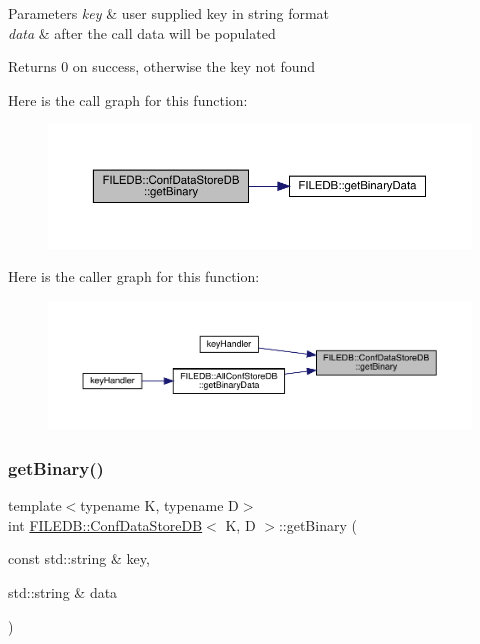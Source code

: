 \begin{DoxyParams}{Parameters}
{\em key} & user supplied key in string format \\
\hline
{\em data} & after the call data will be populated \\
\hline
\end{DoxyParams}
\begin{DoxyReturn}{Returns}
0 on success, otherwise the key not found 
\end{DoxyReturn}
Here is the call graph for this function\+:
\nopagebreak
\begin{figure}[H]
\begin{center}
\leavevmode
\includegraphics[width=350pt]{d8/d19/classFILEDB_1_1ConfDataStoreDB_a971e372585c497dad3b1bc589bc4dd15_cgraph}
\end{center}
\end{figure}
Here is the caller graph for this function\+:\nopagebreak
\begin{figure}[H]
\begin{center}
\leavevmode
\includegraphics[width=350pt]{d8/d19/classFILEDB_1_1ConfDataStoreDB_a971e372585c497dad3b1bc589bc4dd15_icgraph}
\end{center}
\end{figure}
\mbox{\label{classFILEDB_1_1ConfDataStoreDB_a971e372585c497dad3b1bc589bc4dd15}} 
\subsubsection{\texorpdfstring{getBinary()}{getBinary()}\hspace{0.1cm}{\footnotesize\ttfamily [2/2]}}
{\footnotesize\ttfamily template$<$typename K, typename D$>$ \\
int \mbox{\hyperlink{classFILEDB_1_1ConfDataStoreDB}{F\+I\+L\+E\+D\+B\+::\+Conf\+Data\+Store\+DB}}$<$ K, D $>$\+::get\+Binary (\begin{DoxyParamCaption}\item[{const std\+::string \&}]{key,  }\item[{std\+::string \&}]{data }\end{DoxyParamCaption})\hspace{0.3cm}{\ttfamily [inline]}}

